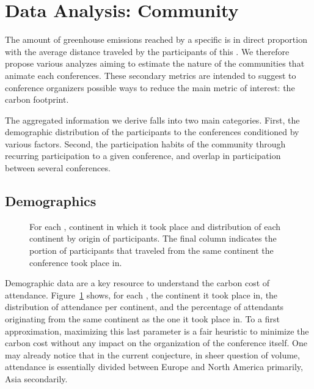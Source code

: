 \section{Data Analysis: Community}
\label{sec:community}

The amount of greenhouse emissions reached by a specific \event is in direct proportion with
the average distance traveled by the participants of this \event.
We therefore propose various analyzes aiming to estimate the nature of the
communities that animate each conferences. These secondary metrics are
intended to suggest to conference organizers possible ways to reduce the
main metric of interest: the carbon footprint. 

The aggregated information we derive falls into two main categories.
First, the demographic distribution of the participants to the conferences
conditioned by various factors.
Second, the participation habits of the community through recurring participation
to a given conference, and overlap in participation between several conferences.


\subsection{Demographics}
\label{subsec:demo}

\begin{figure}
  \caption{For each \event, continent in which it took place and distribution of
    each continent by origin of participants. The final column indicates the
    portion of participants that traveled from the same continent the
    conference took place in.}
  \label{fig:demo-raw}
\end{figure}

Demographic data are a key resource to understand the carbon cost of attendance.
Figure~\ref{fig:demo-raw} shows, for each \event, the
continent it took place in, the distribution of attendance per continent, and
the percentage of attendants originating from the same continent as the one it
took place in. To a first approximation, maximizing this last parameter is a fair
heuristic to minimize the carbon cost without any impact on the organization of
the conference itself. One may already notice that in the current conjecture, in
sheer question of volume, attendance is essentially divided between Europe and
North America primarily, Asia secondarily.

